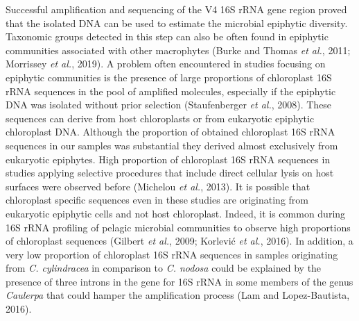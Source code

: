 \documentclass[12pt,]{article}
\begin{document}
Successful amplification and sequencing of the V4 16S rRNA gene region
proved that the isolated DNA can be used to estimate the microbial
epiphytic diversity. Taxonomic groups detected in this step can also be
often found in epiphytic communities associated with other macrophytes
(Burke and Thomas \emph{et al.}, 2011; Morrissey \emph{et al.}, 2019). A
problem often encountered in studies focusing on epiphytic communities
is the presence of large proportions of chloroplast 16S rRNA sequences
in the pool of amplified molecules, especially if the epiphytic DNA was
isolated without prior selection (Staufenberger \emph{et al.}, 2008).
These sequences can derive from host chloroplasts or from eukaryotic
epiphytic chloroplast DNA. Although the proportion of obtained
chloroplast 16S rRNA sequences in our samples was substantial they
derived almost exclusively from eukaryotic epiphytes. High proportion of
chloroplast 16S rRNA sequences in studies applying selective procedures
that include direct cellular lysis on host surfaces were observed before
(Michelou \emph{et al.}, 2013). It is possible that chloroplast specific
sequences even in these studies are originating from eukaryotic
epiphytic cells and not host chloroplast. Indeed, it is common during
16S rRNA profiling of pelagic microbial communities to observe high
proportions of chloroplast sequences (Gilbert \emph{et al.}, 2009;
Korlević \emph{et al.}, 2016). In addition, a very low proportion of
chloroplast 16S rRNA sequences in samples originating from \emph{C.
cylindracea} in comparison to \emph{C. nodosa} could be explained by the
presence of three introns in the gene for 16S rRNA in some members of
the genus \emph{Caulerpa} that could hamper the amplification process
(Lam and Lopez-Bautista, 2016).
\end{document}
